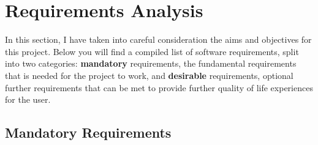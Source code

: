 \documentclass[a4paper, 12pt]{article}
\begin{document}
    \clearpage
    \section{Requirements Analysis}
        In this section, I have taken into careful consideration the aims and objectives for this
        project. Below you will find a compiled list of software requirements, split into two
        categories: \textbf{mandatory} requirements, the fundamental requirements that is needed
        for the project to work, and \textbf{desirable} requirements, optional further requirements
        that can be met to provide further quality of life experiences for the user.

        \subsection{Mandatory Requirements}
\end{document}

